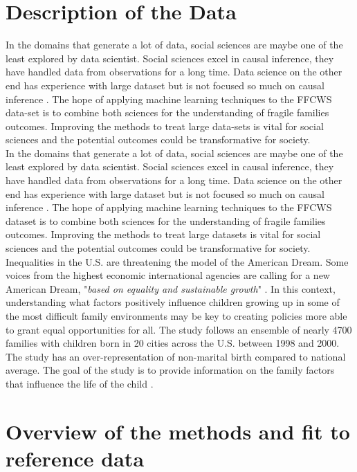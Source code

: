 \documentclass{article} %
\begin{document}
\section{Description of the Data}
In the domains that generate a lot of data, social sciences are maybe one of the least explored by data scientist. Social sciences excel in causal inference, they have handled data from observations for a long time. Data science on the other end has experience with large dataset but is not focused so much on causal inference \cite{grimmer2015we}. The hope of applying machine learning techniques to the FFCWS data-set is to combine both sciences for the understanding of fragile families outcomes. Improving the methods to treat large data-sets is vital for social sciences and the potential outcomes could be transformative for society.\\
In the domains that generate a lot of data, social sciences are maybe one of the least explored by data scientist. Social sciences excel in causal inference, they have handled data from observations for a long time. Data science on the other end has experience with large dataset but is not focused so much on causal inference \cite{grimmer2015we}. The hope of applying machine learning techniques to the FFCWS dataset is to combine both sciences for the understanding of fragile families outcomes. Improving the methods to treat large datasets is vital for social sciences and the potential outcomes could be transformative for society.\\
Inequalities in the U.S. are threatening the model of the American Dream. Some voices from the highest economic international agencies are calling for a new American Dream, "\textit{based on equality and sustainable growth}" \cite{wef2017}. In this context, understanding what factors positively influence children growing up in some of the most difficult family environments may be key to creating policies more able to grant equal opportunities for all. The study follows an ensemble of nearly 4700 families with children born in 20 cities across the U.S. between 1998 and 2000. The study has an over-representation of non-marital birth compared to national average. The goal of the study is to provide information on the family factors that influence the life of the child  \cite{reichman2001fragile}.
\section{Overview of the methods and fit to reference data}
\end{document}
